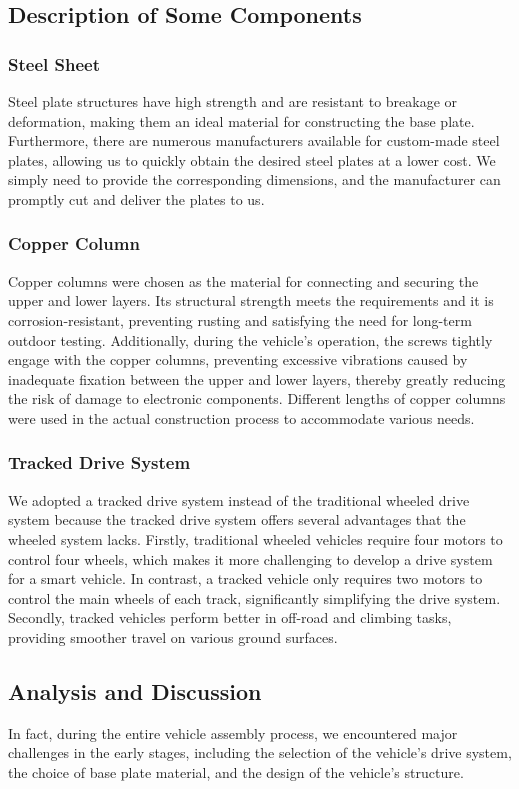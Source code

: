 \documentclass[12pt, a4paper, oneside]{report}
\begin{document}
\subsection{Description of Some Components}
\subsubsection*{Steel Sheet}
Steel plate structures have high strength and are resistant to breakage or deformation, making them an ideal material for constructing the base plate. Furthermore, there are numerous manufacturers available for custom-made steel plates, allowing us to quickly obtain the desired steel plates at a lower cost. We simply need to provide the corresponding dimensions, and the manufacturer can promptly cut and deliver the plates to us.

\subsubsection*{Copper Column}
Copper columns were chosen as the material for connecting and securing the upper and lower layers. Its structural strength meets the requirements and it is corrosion-resistant, preventing rusting and satisfying the need for long-term outdoor testing. Additionally, during the vehicle's operation, the screws tightly engage with the copper columns, preventing excessive vibrations caused by inadequate fixation between the upper and lower layers, thereby greatly reducing the risk of damage to electronic components. Different lengths of copper columns were used in the actual construction process to accommodate various needs.
    
\subsubsection*{Tracked Drive System}
We adopted a tracked drive system instead of the traditional wheeled drive system because the tracked drive system offers several advantages that the wheeled system lacks. Firstly, traditional wheeled vehicles require four motors to control four wheels, which makes it more challenging to develop a drive system for a smart vehicle. In contrast, a tracked vehicle only requires two motors to control the main wheels of each track, significantly simplifying the drive system. Secondly, tracked vehicles perform better in off-road and climbing tasks, providing smoother travel on various ground surfaces.
    
\subsection{Analysis and Discussion}
In fact, during the entire vehicle assembly process, we encountered major challenges in the early stages, including the selection of the vehicle's drive system, the choice of base plate material, and the design of the vehicle's structure.
\end{document}
